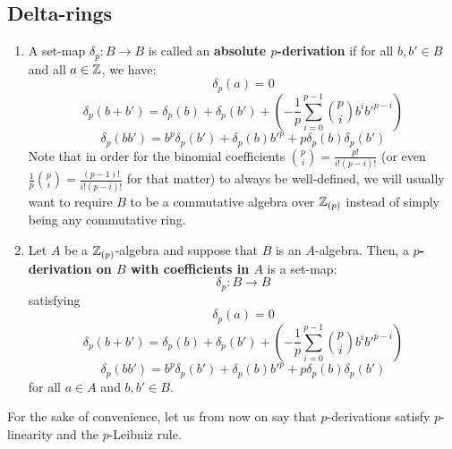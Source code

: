     \subsection{Delta-rings}
        \begin{definition}[$p$-derivations] \label{def: p_derivations}
            \noindent
            \begin{enumerate}
                \item A set-map $\delta_p: B \to B$ is called an \textbf{absolute $p$-derivation} if for all $b, b' \in B$ and all $a \in \mathbb{Z}$, we have:
                    $$\delta_p(a) = 0$$
                    $$\delta_p(b + b') = \delta_p(b) + \delta_p(b') + \left(-\frac1p\sum_{i=0}^{p-1} \binom{p}{i} b^ib'^{p-i}\right)$$
                    $$\delta_p(bb') = b^p\delta_p(b') + \delta_p(b)b'^p + p\delta_p(b)\delta_p(b')$$
                Note that in order for the binomial coefficients $\binom{p}{i} = \frac{p!}{i! (p - i)!}$ (or even $\frac1p \binom{p}{i} = \frac{(p - 1)!}{i! (p - i)!}$ for that matter) to always be well-defined, we will usually want to require $B$ to be a commutative algebra over $\mathbb{Z}_{(p)}$ instead of simply being any commutative ring. 
                \item Let $A$ be a $\mathbb{Z}_{(p)}$-algebra and suppose that $B$ is an $A$-algebra. Then, a \textbf{$p$-derivation on $B$ with coefficients in $A$} is a set-map:
                    $$\delta_p: B \to B$$
                satisfying
                    $$\delta_p(a) = 0$$
                    $$\delta_p(b + b') = \delta_p(b) + \delta_p(b') + \left(-\frac1p\sum_{i=0}^{p-1} \binom{p}{i} b^ib'^{p-i}\right)$$
                    $$\delta_p(bb') = b^p\delta_p(b') + \delta_p(b)b'^p + p\delta_p(b)\delta_p(b')$$
                for all $a \in A$ and $b, b' \in B$.
            \end{enumerate}
        \end{definition}
        \begin{convention}
            For the sake of convenience, let us from now on say that $p$-derivations satisfy $p$-linearity and the $p$-Leibniz rule.
        \end{convention}
        

